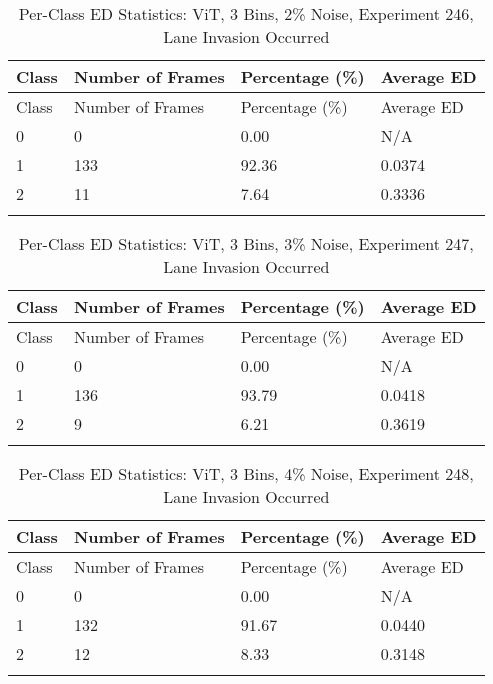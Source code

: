 
\begin{longtable}{@{}llll@{}}
\toprule
Class & Number of Frames & Percentage (\%) & Average ED \\
\midrule
\endfirsthead
\toprule
Class & Number of Frames & Percentage (\%) & Average ED \\
\midrule
\endhead
0 & 0 & 0.00 & N/A \\
1 & 133 & 92.36 & 0.0374 \\
2 & 11 & 7.64 & 0.3336 \\
\bottomrule
\caption{Per-Class ED Statistics: ViT, 3 Bins, 2\% Noise, Experiment 246, Lane Invasion Occurred}
\label{tab:exp246_ViT_3bins_2noise}
\end{longtable}
        


\begin{longtable}{@{}llll@{}}
\toprule
Class & Number of Frames & Percentage (\%) & Average ED \\
\midrule
\endfirsthead
\toprule
Class & Number of Frames & Percentage (\%) & Average ED \\
\midrule
\endhead
0 & 0 & 0.00 & N/A \\
1 & 136 & 93.79 & 0.0418 \\
2 & 9 & 6.21 & 0.3619 \\
\bottomrule
\caption{Per-Class ED Statistics: ViT, 3 Bins, 3\% Noise, Experiment 247, Lane Invasion Occurred}
\label{tab:exp247_ViT_3bins_3noise}
\end{longtable}
        


\begin{longtable}{@{}llll@{}}
\toprule
Class & Number of Frames & Percentage (\%) & Average ED \\
\midrule
\endfirsthead
\toprule
Class & Number of Frames & Percentage (\%) & Average ED \\
\midrule
\endhead
0 & 0 & 0.00 & N/A \\
1 & 132 & 91.67 & 0.0440 \\
2 & 12 & 8.33 & 0.3148 \\
\bottomrule
\caption{Per-Class ED Statistics: ViT, 3 Bins, 4\% Noise, Experiment 248, Lane Invasion Occurred}
\label{tab:exp248_ViT_3bins_4noise}
\end{longtable}
        

